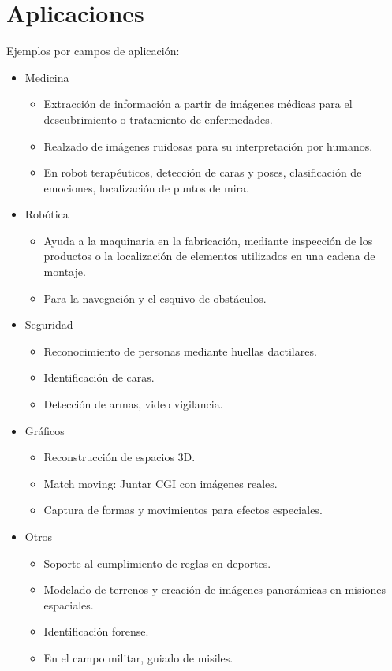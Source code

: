 \section{Aplicaciones}

Ejemplos por campos de aplicación:

\begin{itemize}
  \item Medicina \begin{itemize}
    \item Extracción de información a partir de imágenes médicas para el descubrimiento o tratamiento de enfermedades.
    \item Realzado de imágenes ruidosas para su interpretación por humanos.
    \item En robot terapéuticos, detección de caras y poses, clasificación de emociones, localización de puntos de mira.
  \end{itemize}
  \item Robótica \begin{itemize}
    \item Ayuda a la maquinaria en la fabricación, mediante inspección de los productos o la localización de elementos utilizados en una cadena de montaje.
    \item Para la navegación y el esquivo de obstáculos.
  \end{itemize}
  \item Seguridad \begin{itemize}
    \item Reconocimiento de personas mediante huellas dactilares.
    \item Identificación de caras.
    \item Detección de armas, video vigilancia.
  \end{itemize}
  \item Gráficos \begin{itemize}
    \item Reconstrucción de espacios 3D.
    \item Match moving: Juntar CGI con imágenes reales.
    \item Captura de formas y movimientos para efectos especiales.
  \end{itemize}
  \item Otros \begin{itemize}
    \item Soporte al cumplimiento de reglas en deportes.
    \item Modelado de terrenos y creación de imágenes panorámicas en misiones espaciales.
    \item Identificación forense.
    \item En el campo militar, guiado de misiles.
  \end{itemize}
\end{itemize}


